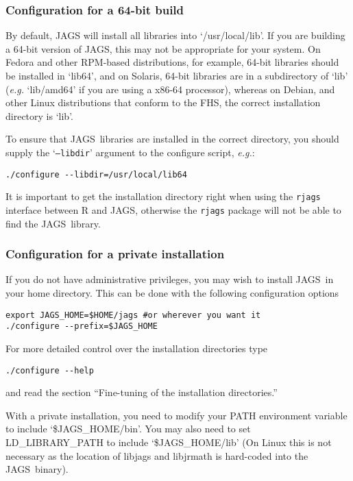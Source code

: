 \documentclass[11pt, a4paper, titlepage]{article}
\newcommand{\JAGS}{\textsf{JAGS}}
\newcommand{\code}[1]{{\bgroup{\normalfont\ttfamily #1}\egroup}}
\newcommand{\samp}[1]{{`\bgroup\normalfont\texttt{#1}'\egroup}}
\newcommand{\file}[1]{{`\normalfont\textsf{#1}'}}
\let\option=\samp
\begin{document}
\subsubsection{Configuration for a 64-bit build}

By default, JAGS will install all libraries into
\file{/usr/local/lib}.  If you are building a 64-bit version of \JAGS,
this may not be appropriate for your system. On Fedora and other
RPM-based distributions, for example, 64-bit libraries should be
installed in \file{lib64}, and on Solaris, 64-bit libraries are in a
subdirectory of \file{lib} ({\em e.g.} \file{lib/amd64} if you are
using a x86-64 processor), whereas on Debian, and other Linux
distributions that conform to the FHS, the correct installation
directory is \file{lib}.

To ensure that \JAGS\ libraries are installed in the correct
directory, you should supply the \option{--libdir} argument to the
configure script, {\em e.g.}:
\begin{verbatim}
./configure --libdir=/usr/local/lib64
\end{verbatim}

It is important to get the installation directory right when using the
\texttt{rjags} interface between R and \JAGS, otherwise the
\texttt{rjags} package will not be able to find the \JAGS\ library.

\subsubsection{Configuration for a private installation}

If you do not have administrative privileges, you may wish to install
\JAGS\ in your home directory. This can be done with the following
configuration options
\begin{verbatim}
export JAGS_HOME=$HOME/jags #or wherever you want it
./configure --prefix=$JAGS_HOME
\end{verbatim}
For more detailed control over the installation directories type
\begin{verbatim}
./configure --help
\end{verbatim}
and read the section ``Fine-tuning of the installation directories.''

With a private installation, you need to modify your PATH environment
variable to include \file{\$JAGS\_HOME/bin}. You may also need to set
\code{LD\_LIBRARY\_PATH} to include \file{\$JAGS\_HOME/lib} (On Linux this
is not necessary as the location of libjags and libjrmath is hard-coded
into the \JAGS\ binary).
\end{document}
